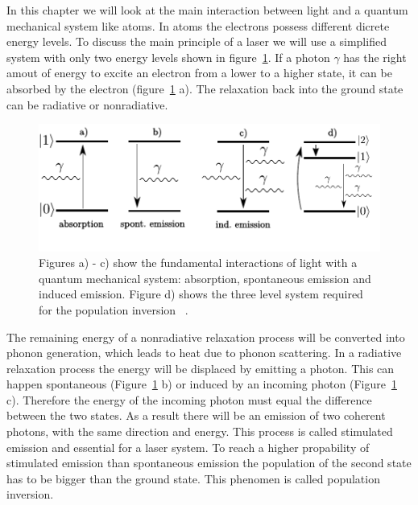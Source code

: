 In this chapter we will look at the main interaction between light and a
quantum mechanical system like atoms. In atoms the electrons possess different
dicrete energy levels. To discuss the main principle of a laser
we will use a simplified system with only two energy levels shown in figure~\ref{fig:twolevelsystem}.
If a photon $\gamma$ has the right amout of energy to excite an electron
from a lower to a higher state, it can be absorbed
by the electron (figure~\ref{fig:twolevelsystem} a).
The relaxation back into the ground state can be radiative or
nonradiative.
\begin{figure}
  \centering
  \includegraphics[width = \textwidth]{Pics/energyscheme.pdf}
  \caption{Figures a) - c) show the fundamental interactions of light with a
  quantum mechanical system: absorption, spontaneous emission and induced emission.
  Figure d) shows the three level system required for the population inversion
 ~\cite{steven}.}%
  \label{fig:twolevelsystem}
\end{figure}
The remaining energy of a nonradiative relaxation process will be converted into
phonon generation, which leads to heat due to phonon scattering.
In a radiative relaxation process the energy will
be displaced by emitting a photon. This can happen spontaneous (Figure~\ref{fig:twolevelsystem} b)
or induced by an incoming photon (Figure~\ref{fig:twolevelsystem} c).
Therefore the energy of the incoming photon must equal the difference between the
two states. As a result there will be an emission of two coherent photons,
with the same direction and energy. This process is called stimulated emission
and essential for a laser system.
To reach a higher propability of stimulated emission
than spontaneous emission the population of the second state has to be bigger
than the ground state. This phenomen is called population inversion.

